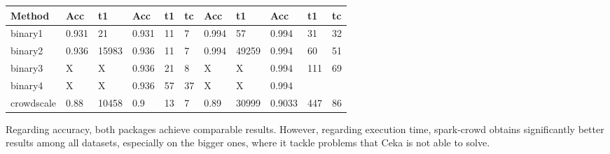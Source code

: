 \documentclass[letterpaper,10pt,english]{sphinxmanual}
\begin{document}
\begin{savenotes}
\begin{tabulary}{\linewidth}[t]{|T|T|T|T|T|T|T|T|T|T|T|}
Method
&\sphinxstyletheadfamily 
Acc
&\sphinxstyletheadfamily 
t1
&\sphinxstyletheadfamily 
Acc
&\sphinxstyletheadfamily 
t1
&\sphinxstyletheadfamily 
tc
&\sphinxstyletheadfamily 
Acc
&\sphinxstyletheadfamily 
t1
&\sphinxstyletheadfamily 
Acc
&\sphinxstyletheadfamily 
t1
&\sphinxstyletheadfamily 
tc
\\
\hline
binary1
&
0.931
&
21
&
0.931
&
11
&
7
&
0.994
&
57
&
0.994
&
31
&
32
\\
\hline
binary2
&
0.936
&
15983
&
0.936
&
11
&
7
&
0.994
&
49259
&
0.994
&
60
&
51
\\
\hline
binary3
&
X
&
X
&
0.936
&
21
&
8
&
X
&
X
&
0.994
&
111
&
69
\\
\hline
binary4
&
X
&
X
&
0.936
&
57
&
37
&
X
&
X
&
0.994
&&\\
\hline
crowdscale
&
0.88
&
10458
&
0.9
&
13
&
7
&
0.89
&
30999
&
0.9033
&
447
&
86
\\
\hline
\end{tabulary}
\par
\sphinxattableend\end{savenotes}

Regarding accuracy, both packages achieve comparable results. However, regarding execution time, spark-crowd obtains
significantly better results among all datasets, especially on the bigger ones, where it tackle problems that
Ceka is not able to solve. 

%
%
\end{document}
